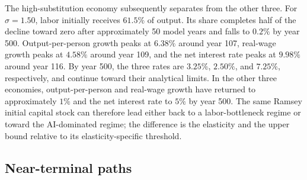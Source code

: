 The high-substitution economy subsequently separates from the other three.
For $\sigma=1.50$, labor initially receives $61.5\%$ of output. Its share
completes half of the decline toward zero after approximately 50 model years
and falls to $0.2\%$ by year 500. Output-per-person growth peaks at $6.38\%$
around year 107, real-wage growth peaks at $4.58\%$ around year 109, and the
net interest rate peaks at $9.98\%$ around year 116. By year 500, the three
rates are $3.25\%$, $2.50\%$, and $7.25\%$, respectively, and continue toward
their analytical limits. In the other three economies, output-per-person and
real-wage growth have returned to approximately $1\%$ and the net interest
rate to $5\%$ by year 500. The same Ramsey initial capital stock can therefore
lead either back to a labor-bottleneck regime or toward the AI-dominated
regime; the difference is the elasticity and the upper bound relative to its
elasticity-specific threshold.




\subsection{Near-terminal paths}
\label{subsec:rewrite-near-terminal}

